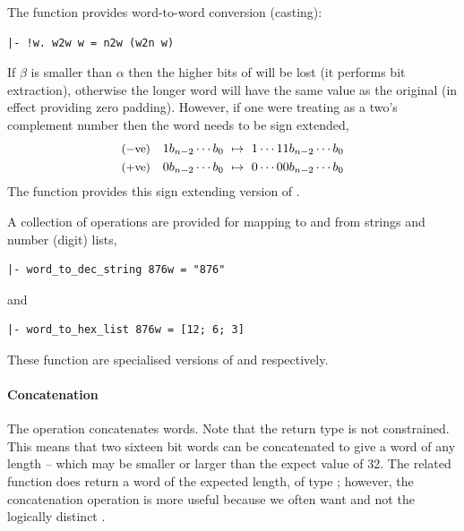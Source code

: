 {The function  provides word-to-word conversion (casting):
\begin{hol}
\begin{verbatim}
|- !w. w2w w = n2w (w2n w)
\end{verbatim}
\end{hol}
If $\beta$ is smaller than $\alpha$ then the higher bits of  will be
lost (it performs bit extraction), otherwise the longer word will have the same value as the original (in effect providing zero padding).
However, if one were treating  as a two's complement number then the
word needs to be sign extended, \ie{}
\begin{eqnarray*}
\mbox{\small ($-$ve)}\quad 1b_{n-2} \cdots b_0\ \mapsto \ 1 \cdots 1 1 b_{n-2}
\cdots b_0 \\
\mbox{\small ($+$ve)}\quad 0b_{n-2} \cdots b_0\ \mapsto \ 0 \cdots 0 0 b_{n-2}
\cdots b_0
\end{eqnarray*}
The function  provides this sign extending version of
.

A collection of operations are provided for mapping to and from strings and number (digit) lists, \eg{}
\begin{hol}
\begin{verbatim}
|- word_to_dec_string 876w = "876"
\end{verbatim}
\end{hol}
and
\begin{hol}
\begin{verbatim}
|- word_to_hex_list 876w = [12; 6; 3]
\end{verbatim}
\end{hol}
These function are specialised versions of  and  respectively.

\paragraph{Concatenation}

The operation  concatenates words.  Note that the return type is not constrained.  This means that two sixteen bit words can be concatenated to give a word of any length -- which may be smaller or larger than the expect value of 32.   The related function  does return a word of the expected length, \ie{} of type \fcp{\bool}{$\alpha+\beta$};  however, the concatenation operation is more useful because we often want  and not the logically distinct .

}
